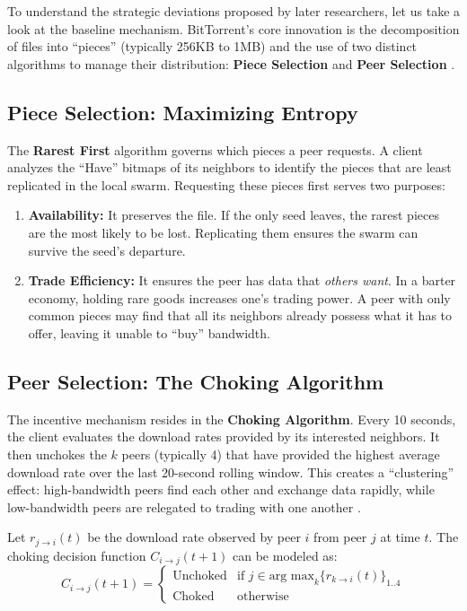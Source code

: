 \documentclass[12pt]{article}
\begin{document}
To understand the strategic deviations proposed by later researchers, let us take a look at the baseline mechanism. BitTorrent's core innovation is the decomposition of files into ``pieces'' (typically 256KB to 1MB) and the use of two distinct algorithms to manage their distribution: \textbf{Piece Selection} and \textbf{Peer Selection} \cite{Cohen2003}.

\subsection{Piece Selection: Maximizing Entropy}
The \textbf{Rarest First} algorithm governs which pieces a peer requests. A client analyzes the ``Have'' bitmaps of its neighbors to identify the pieces that are least replicated in the local swarm. Requesting these pieces first serves two purposes:
\begin{enumerate}
    \item \textbf{Availability:} It preserves the file. If the only seed leaves, the rarest pieces are the most likely to be lost. Replicating them ensures the swarm can survive the seed's departure.
    \item \textbf{Trade Efficiency:} It ensures the peer has data that \textit{others want}. In a barter economy, holding rare goods increases one's trading power. A peer with only common pieces may find that all its neighbors already possess what it has to offer, leaving it unable to ``buy'' bandwidth.
\end{enumerate}

\subsection{Peer Selection: The Choking Algorithm}
The incentive mechanism resides in the \textbf{Choking Algorithm}. Every 10 seconds, the client evaluates the download rates provided by its interested neighbors. It then unchokes the $k$ peers (typically 4) that have provided the highest average download rate over the last 20-second rolling window. This creates a ``clustering'' effect: high-bandwidth peers find each other and exchange data rapidly, while low-bandwidth peers are relegated to trading with one another \cite{Legout2007}.

Let $r_{j \to i}(t)$ be the download rate observed by peer $i$ from peer $j$ at time $t$. The choking decision function $C_{i \to j}(t+1)$ can be modeled as:
\begin{equation}
C_{i \to j}(t+1) = 
\begin{cases} 
\text{Unchoked} & \text{if } j \in \text{arg max}_k \{ r_{k \to i}(t) \}_{1..4} \\
\text{Choked} & \text{otherwise}
\end{cases}
\end{equation}
\end{document}
